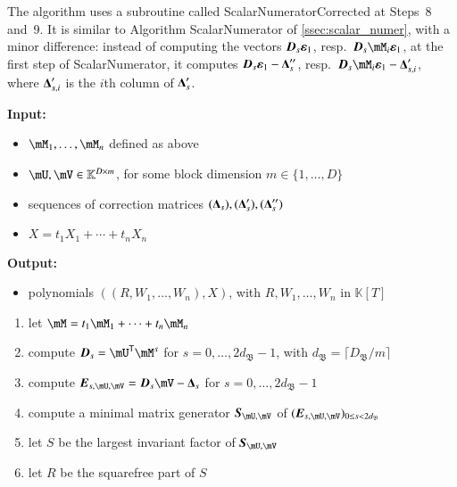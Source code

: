 \documentclass[final,1p,times,authoryear]{elsarticle}
\newcommand{\mat}[1]{\bm{\MakeUppercase{#1}}} %
\newcommand{\col}[1]{\bm{\MakeLowercase{#1}}} %
\newcommand{\mainalgoname}{\mathsf{ BlockParametrization}}
\newcommand{\lf}{X}
\newcommand{\trsp}[1]{#1^{\mathsf{T}}} %
\def\K{\mathbb{K}}
\def\K {\ensuremath{\mathbb{K}}}
\newcommand{\mUt}{\trsp{\mU}}
\begin{document}
The algorithm uses a subroutine called {\sf ScalarNumeratorCorrected}
at Steps~8 and~9.  It is similar to Algorithm {\sf ScalarNumerator} of
\cref{ssec:scalar_numer}, with a minor difference: instead of computing the
vectors $\mat{D}_s \col{\varepsilon}_1$, resp.\ $\mat{D}_s\mM_i
\col{\varepsilon}_1$, at the first step of  {\sf ScalarNumerator}, it computes $\mat{D}_s
\col{\varepsilon}_1-\mat{\Delta}''_s$, resp.\ $\mat{D}_s\mM_i
\col{\varepsilon}_1-\mat{\Delta}'_{s,i}$, where $\mat{\Delta}'_{s,i}$
is the $i$th column of $\mat{\Delta}'_{s}$.

\begin{algorithm}[H]
  \caption{$\mainalgoname{\sf Residual}(\mM_1,\dots,\mM_n,\mU,\mV,(\mat{\Delta}_s),(\mat{\Delta}'_s),(\mat{\Delta}''_s),\lf)$}
  {\bf Input:} \vspace{-0.5em}
  \begin{itemize}
    \item $\mM_1,\dots,\mM_n$ defined as above
    \item  $\mU,\mV \in \mathbb{K}^{D \times m}$, for some block dimension  $m \in \{1,\dots,D\}$
    \item sequences of correction matrices $(\mat{\Delta}_s),(\mat{\Delta}'_s),(\mat{\Delta}''_s)$
    \item $\lf =t_1 X_1 + \cdots + t_n X_n$
  \end{itemize}
  {\bf Output:}  \vspace{-0.5em}
  \begin{itemize}
    \item  polynomials $((R,W_1,\dots,W_n),\lf)$, with $R,W_1,\dots,W_n$ in $\K[T]$
  \end{itemize}
  \begin{enumerate}
    \item\label{residualstep1}   let $\mM = t_1 \mM_1 + \cdots + t_n \mM_n$
    \item\label{residualstep3} { compute $\mat{D}_s = \mUt\mM^s$ for $s=0,\dots,2d_\mathfrak{B}-1$, with $d_\mathfrak{B} = \lceil D_\mathfrak{B}/m \rceil$}
    \item\label{residualstep4} { compute $\mat{E}_{s,\mU,\mV}= \mat{D}_s\mV-\mat{\Delta}_s$ for $s=0,\dots, 2d_\mathfrak{B}-1$}
    \item\label{residualstep5} { compute a minimal matrix generator $\mat{S}_{\mU,\mV}$ of $(\mat{E}_{s,\mU,\mV})_{0 \le s < 2d_\mathfrak{B}}$}
    \item\label{residualstep6} { let $S$ be the largest invariant factor of $\mat{S}_{\mU,\mV}$}
    \item\label{residualstep7} { let $R$ be  the squarefree part  of $S$}

\end{enumerate}
\end{algorithm}
\end{document}
